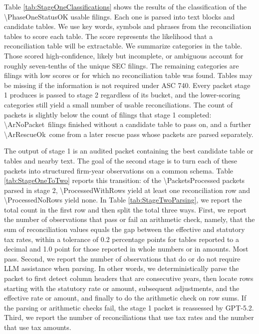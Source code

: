 \documentclass[11pt,letterpaper]{article}
\newcommand{\CountNum}[1]{\num[round-mode=places,round-precision=0]{#1}}
\begin{document}
Table \ref{tab:StageOneClassifications} shows the results of the 
classification of the \CountNum{\PhaseOneStatusOK} usable filings.
Each one is parsed into text blocks and candidate tables. We use
key words, symbols and phrases from the reconciliation tables to
score each table. The score represents the likelihood that 
a reconciliation table will be extractable. We summarize categories
in the table.  Those scored high-confidence, likely but incomplete, or
ambiguous account for roughly seven-tenths of the unique SEC filings.
The remaining categories are filings with low scores or for which no
reconciliation table was found. Tables may be missing if the
information is not required under ASC 740. Every packet stage 1 produces is passed to stage 2
regardless of its bucket, and the lower-scoring categories still yield a
small number of usable reconciliations. The count of packets is slightly
below the count of filings that stage 1 completed:
\CountNum{\ArNoPacket}\ filings finished without a candidate table to
pass on, and a further \CountNum{\ArRescueOk}\ come from a later
rescue pass whose packets are parsed separately.

The output of stage 1 is an audited packet containing the best candidate
table or tables and nearby text. The goal of the second stage is to
turn each of these packets into structured firm-year observations on a common
schema. Table \ref{tab:StageOneToTwo} reports this transition: of the
\CountNum{\PacketsProcessed} packets parsed in stage 2,
\CountNum{\ProcessedWithRows} yield at least one reconciliation row and
\CountNum{\ProcessedNoRows} yield none.
In Table \ref{tab:StageTwoParsing}, we report the total count
in the first row and then split the total three ways. First, we report
the number of observations that pass or fail an arithmetic check, namely,  
that the sum of reconciliation values equals the gap between the effective 
and statutory tax rates, within a tolerance of 0.2 percentage points for
tables reported to a decimal and 1.0 point for those reported in whole
numbers or in amounts. Most pass.  Second, we report the number
of observations that do or do not require LLM assistance when parsing.
In other words, we deterministically parse the packet to first detect 
column headers that are consecutive
years, then locate rows starting with the statutory rate or amount, subsequent 
adjustments, and the effective rate or amount, and finally to do the
arithmetic check on row sums. If the parsing or arithmetic checks fail,
the stage 1 packet is reassessed by GPT-5.2. Third, we report
the number of reconciliations that use tax rates and the number
that use tax amounts.
\end{document}
